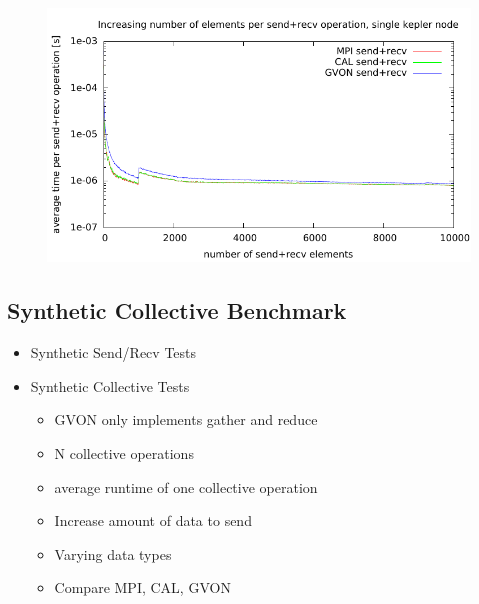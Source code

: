 \begin{figure}[H]
  \centering \includegraphics[width=\textwidth]{plots/50_nsize_kepler}
  \caption{ }
  \label{fig:nsize_laser}
\end{figure}



\subsection{Synthetic Collective Benchmark}
\begin{itemize}
\item Synthetic Send/Recv Tests
\item Synthetic Collective Tests
  \begin{itemize}
  \item GVON only implements gather and reduce
  \item N collective operations
  \item average runtime of one collective operation
  \item Increase amount of data to send
  \item Varying data types
  \item Compare MPI, CAL, GVON
  \end{itemize}

\end{itemize}

